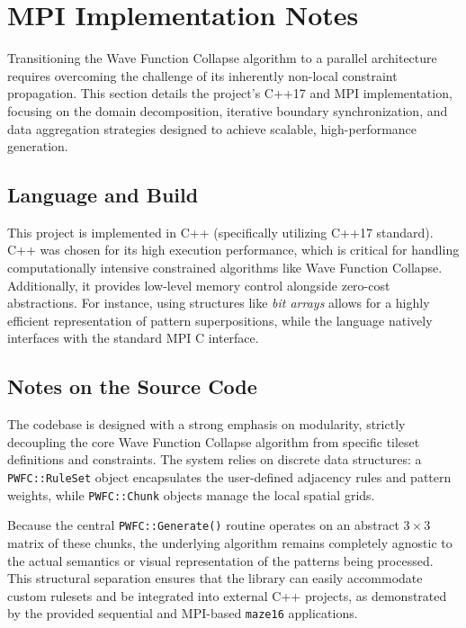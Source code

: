 \section{MPI Implementation Notes}

Transitioning the Wave Function Collapse algorithm to a parallel architecture requires overcoming the challenge of its inherently non-local constraint propagation. This section details the project's C++17 and MPI implementation, focusing on the domain decomposition, iterative boundary synchronization, and data aggregation strategies designed to achieve scalable, high-performance generation.

\subsection{Language and Build}

This project is implemented in C++ (specifically utilizing C++17 standard). C++ was chosen for its high execution performance, which is critical for handling computationally intensive constrained algorithms like Wave Function Collapse. Additionally, it provides low-level memory control alongside zero-cost abstractions. For instance, using structures like \textit{bit arrays} allows for a highly efficient representation of pattern superpositions, while the language natively interfaces with the standard MPI C interface.

\subsection{Notes on the Source Code}

The codebase is designed with a strong emphasis on modularity, strictly decoupling the core Wave Function Collapse algorithm from specific tileset definitions and constraints. The system relies on discrete data structures: a \texttt{PWFC::RuleSet} object encapsulates the user-defined adjacency rules and pattern weights, while \texttt{PWFC::Chunk} objects manage the local spatial grids. 

Because the central \texttt{PWFC::Generate()} routine operates on an abstract $3 \times 3$ matrix of these chunks, the underlying algorithm remains completely agnostic to the actual semantics or visual representation of the patterns being processed. This structural separation ensures that the library can easily accommodate custom rulesets and be integrated into external C++ projects, as demonstrated by the provided sequential and MPI-based \texttt{maze16} applications.

